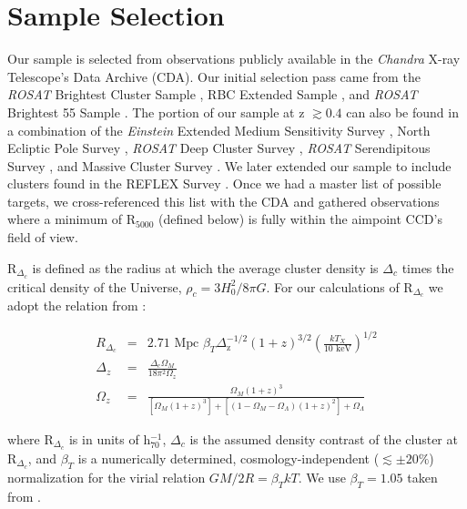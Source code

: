 \documentclass{emulateapj}
\begin{document}
\section{Sample Selection} \label{sec:selection}

Our sample is selected from observations publicly available in the
{\textit{Chandra}} X-ray Telescope's Data Archive (CDA). Our initial
selection pass came from the {\textit{ROSAT}} Brightest Cluster Sample
\citep{1998MNRAS.301..881E}, RBC Extended Sample
\citep{2000MNRAS.318..333E}, and {\textit{ROSAT}} Brightest 55 Sample
\citep{1990MNRAS.245..559E, 1998MNRAS.298..416P}. The portion of our
sample at z $\gtrsim 0.4$ can also be found in a combination of the
{\textit{Einstein}} Extended Medium Sensitivity Survey
\citep{1990ApJS...72..567G}, North Ecliptic Pole Survey
\citep{2006ApJS..162..304H}, {\textit{ROSAT}} Deep Cluster Survey
\citep{1995ApJ...445L..11R}, {\textit{ROSAT}} Serendipitous Survey
\citep{1998ApJ...502..558V}, and Massive Cluster Survey
\citep{2001ApJ...553..668E}. We later extended our sample to include
clusters found in the REFLEX Survey \citep{2004A&A...425..367B}. Once
we had a master list of possible targets, we cross-referenced this
list with the CDA and gathered observations where a minimum of
R$_{5000}$ (defined below) is fully within the aimpoint CCD's field of
view.

R$_{\Delta_c}$ is defined as the radius at which the average cluster
density is $\Delta_c$ times the critical density of the Universe,
$\rho_c=3H_{0}^2/8\pi G$. For our calculations of R$_{\Delta_c}$ we adopt the relation
from \cite{2002A&A...389....1A}:

\begin{eqnarray}
R_{\Delta_c} &=& 2.71 \text{ Mpc }
\beta_T
\Delta_{\text{z}}^{-1/2}
(1+z)^{3/2}
(\frac{kT_X}{10 \text{ keV}})^{1/2}\\
\Delta_z &=& \frac{\Delta_c \Omega_M}{18\pi^2\Omega_z} \nonumber \\
\Omega_z &=& \frac{\Omega_M (1+z)^3}{[\Omega_M
(1+z)^3]+[(1-\Omega_M-\Omega_{\Lambda})(1+z)^2]+\Omega_{\Lambda}} \nonumber
\end{eqnarray}

where R$_{\Delta_c}$ is in units of h$_{70}^{-1}$, $\Delta_c$ is
the assumed density contrast of the cluster at R$_{\Delta_c}$, and
$\beta_T$ is a numerically determined, cosmology-independent
($\lesssim \pm 20\%$) normalization for the virial relation $GM/2R =
\beta_TkT$. We use $\beta_T = 1.05$ taken from
\cite{1996ApJ...469..494E}.
\end{document}
